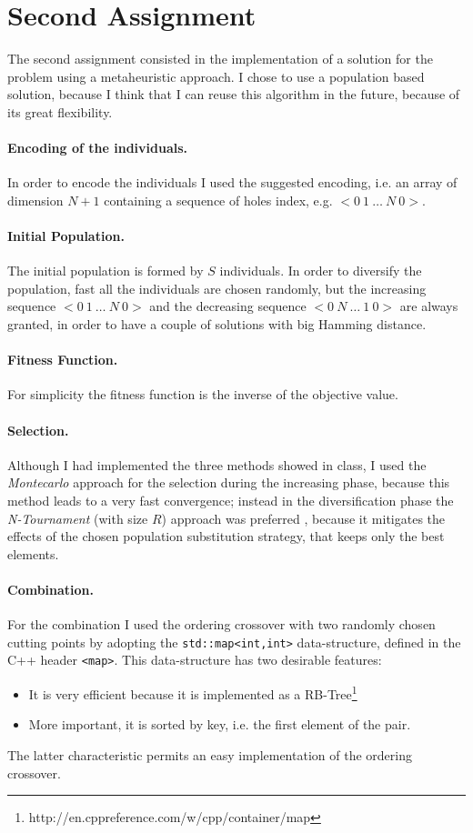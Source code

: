 \section{Second Assignment}
\label{sec:problemII}
The second assignment consisted in the implementation of a solution for the problem
using a metaheuristic approach.
I chose to use a population based solution, because I think that I can reuse this algorithm
in the future, because of its great flexibility.
\paragraph{Encoding of the individuals.} In order to encode the individuals I used the suggested
encoding, i.e. an array of dimension $N+1$ containing a sequence of holes index, e.g.
$<0\ 1\ \dots\ N\ 0>$.

\paragraph{Initial Population.} The initial population is formed by $S$ individuals.
In order to diversify the population, fast all the individuals are chosen randomly, but
the increasing sequence $<0\ 1\ \dots\ N\ 0>$ and the decreasing sequence $<0\ N\ \dots\ 1\ 0>$
are always granted, in order to have a couple of solutions with big Hamming distance. 


\paragraph{Fitness Function.} For simplicity the fitness function is the inverse of the
objective value.

\paragraph{Selection.} Although I had implemented the three methods showed in class, I used the \emph{Montecarlo} approach
for the selection during the increasing phase, because this method leads to a very fast convergence; instead in the diversification phase the \emph{N-Tournament} (with size $R$) approach 
was preferred , because it
mitigates the effects of the chosen population substitution strategy, that 
keeps only the best elements.

\paragraph{Combination.} For the combination I used the ordering crossover with two randomly
chosen cutting points by adopting the
\verb|std::map<int,int>| data-structure, defined in the C++ header \verb|<map>|.
This data-structure has two desirable features:
\begin{itemize}
	\item It is very efficient because it is 
	implemented as a RB-Tree\footnote{http://en.cppreference.com/w/cpp/container/map}
	\item More important, it is sorted by key, i.e. the first element of the pair.

\end{itemize} 
The latter characteristic permits an easy implementation of the ordering crossover.

